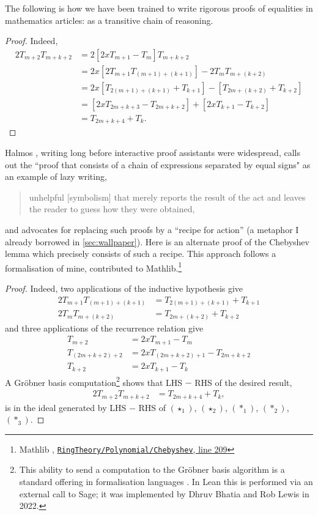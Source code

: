 \documentclass[runningheads]{llncs}
\begin{document}
The following is how we have been trained to write rigorous proofs of equalities in mathematics articles:
as a transitive chain of reasoning.

  \begin{proof}
Indeed,
\begin{align*}
2T_{m+2}T_{m+k+2}
&=2[2xT_{m+1}-T_m]T_{m+k+2}\\
&=2x[2T_{m+1}T_{(m+1)+(k+1)}]-2T_mT_{m+(k+2)}\\
&=2x[T_{2(m+1)+(k+1)}+T_{k+1}]-[T_{2m+(k+2)}+T_{k+2}]\\
&=[2xT_{2m+k+3}-T_{2m+k+2}]+[2xT_{k+1}-T_{k+2}]\\
&=T_{2m+k+4}+T_{k}.
\end{align*}
  \end{proof}



Halmos \cite[section 16]{Hal70},
writing long before interactive proof assistants were widespread,
 calls out the ``proof that consists of a chain of expressions separated by equal signs"
as an example of lazy writing,
\begin{quote}
unhelpful [symbolism]
that merely reports the result of the act and leaves the reader to guess how they were obtained, 
\end{quote}
and advocates for replacing such proofs by a ``recipe for action''
(a metaphor I already borrowed in \cref{sec:wallpaper}).
Here is an alternate proof of the Chebyshev lemma which precisely consists of such a recipe.
This approach follows a formalisation of mine, contributed to Mathlib.\footnote{
  Mathlib \cite{Mathlib}, \href{https://github.com/leanprover-community/mathlib4/blob/21b3a48ba0f69a4ae9eb44dbacbc4de43a6290bf/Mathlib/RingTheory/Polynomial/Chebyshev.lean\#L209}{\texttt{RingTheory/Polynomial/Chebyshev}, line 209}
}
\begin{proof}
  Indeed, two applications of the inductive hypothesis give
\begin{align}
  2T_{m+1}T_{(m+1)+(k+1)}&=T_{2(m+1)+(k+1)}+T_{k+1}\tag{$\star_1$}\\
  2T_mT_{m+(k+2)}&=T_{2m+(k+2)}+T_{k+2}\tag{$\star_2$}
\end{align}
and three applications of the recurrence relation give
\begin{align*}
T_{m+2}&=2xT_{m+1}-T_m\tag{$*_1$}\\
T_{(2m+k+2)+2}&=2xT_{(2m+k+2)+1}-T_{2m+k+2}\tag{$*_2$}\\
T_{k+2}&=2xT_{k+1}-T_{k}\tag{$*_3$}
\end{align*}
A Gr\"obner basis computation\footnote{
  This ability to send a computation to the Gr\"obner basis algorithm
  is a standard offering in formalisation languages \cite{Har07,CW07,Pot08}.
  In Lean this is performed via an external call to Sage;
  it was implemented by Dhruv Bhatia and Rob Lewis in 2022.}
shows that LHS $-$ RHS of the desired result,
\begin{align*}
2T_{m+2}T_{m+k+2}&=T_{2m+k+4}+T_{k},
\end{align*}
is in the ideal generated by LHS $-$ RHS of $(\star_1)$, $(\star_2)$, $(*_1)$, $(*_2)$, $(*_3)$.
\end{proof}
\end{document}
